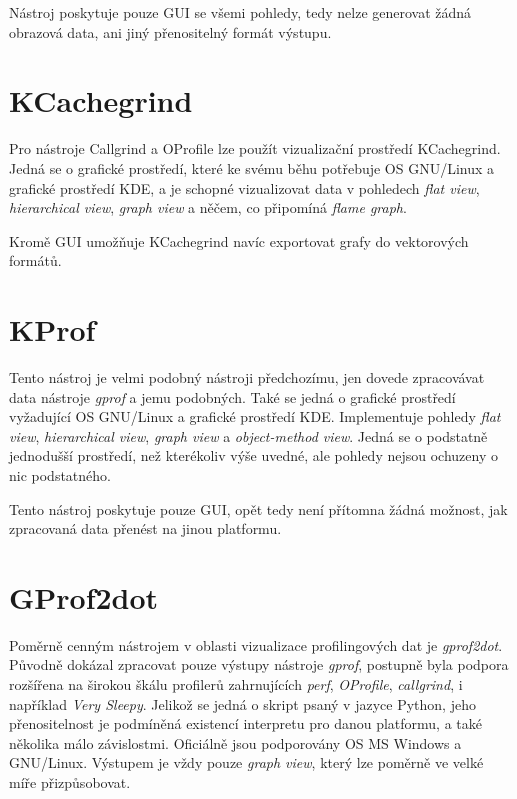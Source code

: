 \documentclass[czech,BP]{thesiskiv}
\begin{document}
Nástroj poskytuje pouze GUI se všemi pohledy, tedy nelze generovat žádná obrazová data, ani jiný přenositelný formát výstupu.

\section{KCachegrind}

Pro nástroje Callgrind a OProfile lze použít vizualizační prostředí KCachegrind. Jedná se o grafické prostředí, které ke svému běhu potřebuje OS GNU/Linux a grafické prostředí KDE, a je schopné vizualizovat data v pohledech \emph{flat view}, \emph{hierarchical view}, \emph{graph view} a něčem, co připomíná \emph{flame graph}.

Kromě GUI umožňuje KCachegrind navíc exportovat grafy do vektorových formátů.

\section{KProf}

Tento nástroj je velmi podobný nástroji předchozímu, jen dovede zpracovávat data nástroje \emph{gprof} a jemu podobných. Také se jedná o grafické prostředí vyžadující OS GNU/Linux a grafické prostředí KDE. Implementuje pohledy \emph{flat view}, \emph{hierarchical view}, \emph{graph view} a \emph{object-method view}. Jedná se o podstatně jednodušší prostředí, než kterékoliv výše uvedné, ale pohledy nejsou ochuzeny o nic podstatného.

Tento nástroj poskytuje pouze GUI, opět tedy není přítomna žádná možnost, jak zpracovaná data přenést na jinou platformu.

\section{GProf2dot}

Poměrně cenným nástrojem v oblasti vizualizace profilingových dat je \emph{gprof2dot}. Původně dokázal zpracovat pouze výstupy nástroje \emph{gprof}, postupně byla podpora rozšířena na širokou škálu profilerů zahrnujících \emph{perf}, \emph{OProfile}, \emph{callgrind}, i například \emph{Very Sleepy}. Jelikož se jedná o skript psaný v jazyce Python, jeho přenositelnost je podmíněná existencí interpretu pro danou platformu, a také několika málo závislostmi. Oficiálně jsou podporovány OS MS Windows a GNU/Linux. Výstupem je vždy pouze \emph{graph view}, který lze poměrně ve velké míře přizpůsobovat.
\end{document}
